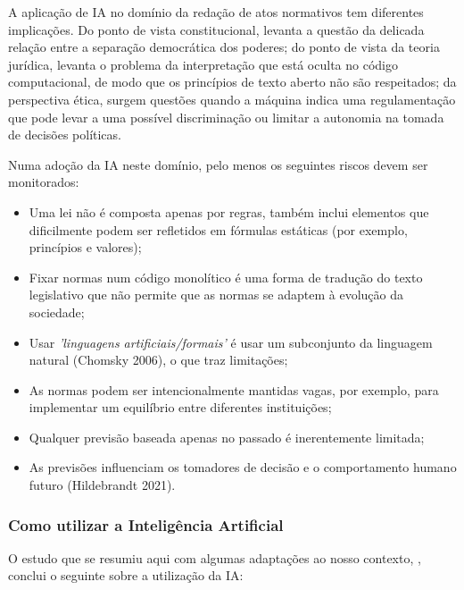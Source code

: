 A aplicação de IA no domínio da redação de atos normativos tem diferentes implicações. 
Do ponto de vista constitucional, levanta a questão da delicada relação entre a separação democrática dos poderes; 
do ponto de vista da teoria jurídica, levanta o problema da interpretação que está oculta no código computacional, 
de modo que os princípios de texto aberto não são respeitados; da perspectiva ética, surgem questões quando a máquina 
indica uma regulamentação que pode levar a uma possível discriminação ou limitar a autonomia na tomada de decisões políticas.

Numa adoção da IA neste domínio, pelo menos os seguintes riscos devem ser monitorados:

\begin{itemize}

    \item Uma lei não é composta apenas por regras, também inclui elementos que dificilmente podem ser refletidos em fórmulas 
    estáticas (por exemplo, princípios e valores);

    \item Fixar normas num código monolítico é uma forma de tradução do texto legislativo que não permite que as normas se 
    adaptem à evolução da sociedade;

    \item Usar \emph{'linguagens artificiais/formais'} é usar um subconjunto da linguagem natural (Chomsky 2006), 
    o que traz limitações;
    
    \item As normas podem ser intencionalmente mantidas vagas, por exemplo, para implementar um equilíbrio entre diferentes 
    instituições;

    \item Qualquer previsão baseada apenas no passado é inerentemente limitada;
    \item As previsões influenciam os tomadores de decisão e o comportamento humano futuro (Hildebrandt 2021).

\end{itemize}

\subsubsection{Como utilizar a Inteligência Artificial}

O estudo que se resumiu aqui com algumas adaptações ao nosso contexto, \cite{PFPD22}, conclui o seguinte sobre a utilização da IA:

